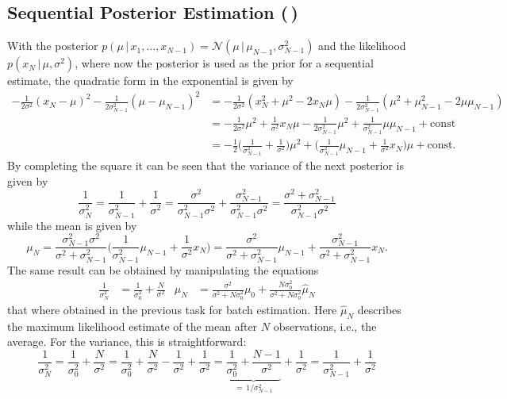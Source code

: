 \documentclass[11pt, a4paper]{scrartcl}
\newcommand{\given}{\,\vert\,}
\newcommand{\diffstar}{\texorpdfstring{\raisebox{-1pt}{\resizebox{!}{8pt}{\(\star\)}}}{*}}
\newcommand{\twostar}  {(\diffstar\,\diffstar)}
\begin{document}
		\subsection{Sequential Posterior Estimation  \twostar}
			With the posterior \( p(\mu \given x_1, \dots, x_{N - 1}) = \mathcal{N}(\mu \given \mu_{N - 1}, \sigma_{N - 1}^2) \) and the likelihood \( p(x_N \given \mu, \sigma^2) \), where now the posterior is used as the prior for a sequential estimate, the quadratic form in the exponential is given by
			\begin{align}
				-\frac{1}{2 \sigma^2} (x_N - \mu)^2 - \frac{1}{2 \sigma_{N - 1}^2} (\mu - \mu_{N - 1})^2
					&= -\frac{1}{2 \sigma^2} (x_N^2 + \mu^2 - 2 x_N \mu) - \frac{1}{2 \sigma_{N - 1}^2} (\mu^2 + \mu_{N - 1}^2 - 2 \mu \mu_{N - 1}) \\
					&= -\frac{1}{2 \sigma^2} \mu^2 + \frac{1}{\sigma^2} x_N \mu - \frac{1}{2 \sigma_{N - 1}^2} \mu^2 + \frac{1}{\sigma_{N - 1}^2} \mu \mu_{N - 1} + \mathrm{const} \\
					&= -\frac{1}{2} \bigg( \frac{1}{\sigma_{N - 1}^2} + \frac{1}{\sigma^2} \bigg) \mu^2 + \bigg( \frac{1}{\sigma_{N - 1}^2} \mu_{N - 1} + \frac{1}{\sigma^2} x_N \bigg) \mu + \mathrm{const}.
			\end{align}
			By completing the square it can be seen that the variance of the next posterior is given by
			\begin{equation}
				\frac{1}{\sigma_N^2}
					= \frac{1}{\sigma_{N - 1}^2} + \frac{1}{\sigma^2}
					= \frac{\sigma^2}{\sigma_{N - 1}^2 \sigma^2} + \frac{\sigma_{N - 1}^2}{\sigma_{N - 1}^2 \sigma^2}
					= \frac{\sigma^2 + \sigma_{N - 1}^2}{\sigma_{N - 1}^2 \sigma^2}
			\end{equation}
			while the mean is given by
			\begin{equation}
				\mu_N
					= \frac{\sigma_{N - 1}^2 \sigma^2}{\sigma^2 + \sigma_{N - 1}^2} \bigg( \frac{1}{\sigma_{N - 1}^2} \mu_{N - 1} + \frac{1}{\sigma^2} x_N \bigg)
					= \frac{\sigma^2}{\sigma^2 + \sigma_{N - 1}^2} \mu_{N - 1} + \frac{\sigma_{N - 1}^2}{\sigma^2 + \sigma_{N - 1}^2} x_N.
			\end{equation}
			The same result can be obtained by manipulating the equations
			\begin{align}
				\frac{1}{\sigma_N^2} &= \frac{1}{\sigma_0^2} + \frac{N}{\sigma^2} &
				\mu_N &= \frac{\sigma^2}{\sigma^2 + N \sigma_0^2} \mu_0 + \frac{N \sigma_0^2}{\sigma^2 + N \sigma_0^2} \hat{\mu}_N
			\end{align}
			that where obtained in the previous task for batch estimation. Here \(\hat{\mu}_N\) describes the maximum likelihood estimate of the mean after \(N\) observations, i.e., the average. For the variance, this is straightforward:
			\begin{equation}
				\frac{1}{\sigma_N^2}
					= \frac{1}{\sigma_0^2} + \frac{N}{\sigma^2}
					= \frac{1}{\sigma_0^2} + \frac{N}{\sigma^2} - \frac{1}{\sigma^2} + \frac{1}{\sigma^2}
					= \underbrace{\frac{1}{\sigma_0^2} + \frac{N - 1}{\sigma^2}}_{=\, 1 / \sigma_{N - 1}^2} + \frac{1}{\sigma^2}
					= \frac{1}{\sigma_{N - 1}^2} + \frac{1}{\sigma^2}
			\end{equation}
\end{document}
